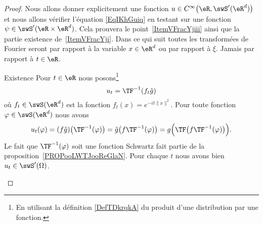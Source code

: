 \begin{proof}
    Nous allons donner explicitement une fonction \( u\in C^{\infty}\big( \eR,\swS'(\eR^d) \big)\) et nous allons vérifier l'équation \eqref{EqIKhGuiq} en testant sur une fonction \( \psi\in\swS'(\eR\times \eR^d)\). Cela prouvera le point~\ref{ItemVFracYjiii} ainsi que la partie existence de~\ref{ItemVFracYji}. Dans ce qui suit toutes les transformées de Fourier seront par rapport à la variable \( x\in \eR^d\) ou par rapport à \( \xi\). Jamais par rapport à \( t\in \eR\).

    \begin{subproof}
    \item[Existence]
        Pour \( t\in \eR\) nous posons\footnote{En utilisant la définition \eqref{DefTDkrqkA} du produit d'une distribution par une fonction.}
        \begin{equation}
            u_t=\TF^{-1}(f_t\hat g)
        \end{equation}
        où \( f_t\in\swS(\eR^d)\) est la fonction \( f_t(x)= e^{-it\| x \|^2}\). Pour toute fonction \( \varphi\in\swS(\eR^d)\) nous avons
        \begin{equation}
            u_t(\varphi)=(f\hat g)\big( \TF^{-1}(\varphi) \big)=\hat g\big( f\TF^{-1}(\varphi) \big)=g\Big( \TF\big( f\TF^{-1}(\varphi) \big) \Big).
        \end{equation}
        Le fait que \( \TF^{-1}(\varphi)\) soit une fonction Schwartz fait partie de la proposition~\ref{PROPooLWTJooReGlaN}. Pour chaque \( t\) nous avons bien \( u_t\in\swS'(\Omega)\).


\end{subproof}
\end{proof}
